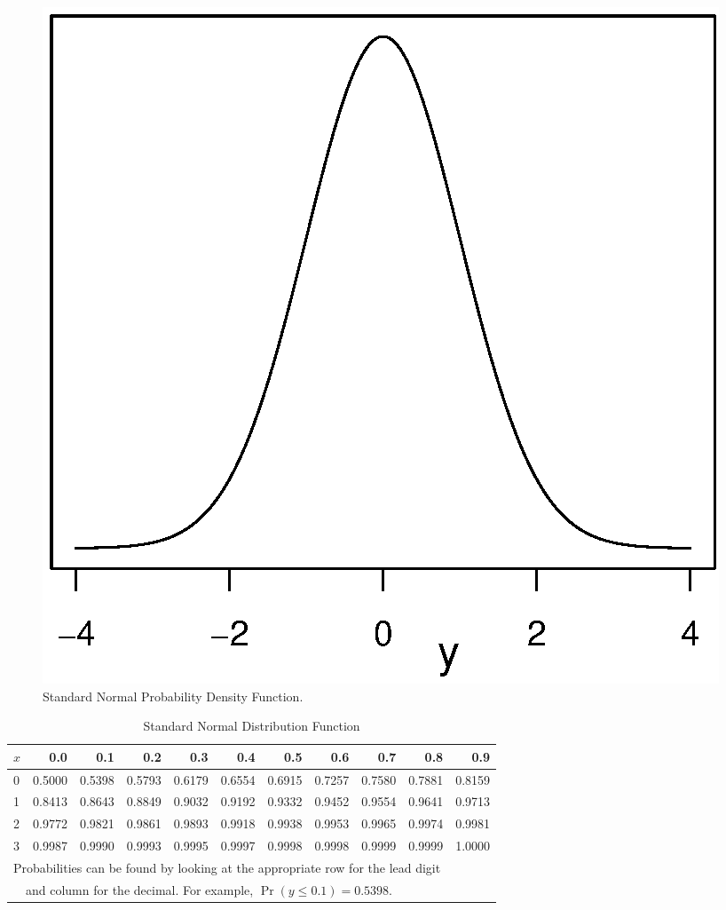 \begin{figure}[htp]
  \begin{center}
    \includegraphics[scale=.6]{Appendices/FAppendNormal.eps}
    \caption{ \small  Standard Normal Probability Density Function.}
  \end{center}
\end{figure}

\begin{table}[h]
 \caption{\label{AP:NormalProbTable} Standard Normal
Distribution Function}
\begin{tabular}{l|rrrrrrrrrr}\hline
         $x$  &          0.0 &        0.1 &        0.2 &        0.3 &        0.4 &        0.5 &        0.6 &        0.7 &        0.8 &        0.9 \\
\hline
         0 &     0.5000 &     0.5398 &     0.5793 &     0.6179 &     0.6554 &     0.6915 &     0.7257 &     0.7580 &     0.7881 &     0.8159 \\
         1 &     0.8413 &     0.8643 &     0.8849 &     0.9032 &     0.9192 &     0.9332 &     0.9452 &     0.9554 &     0.9641 &     0.9713 \\
         2 &     0.9772 &     0.9821 &     0.9861 &     0.9893 &     0.9918 &     0.9938 &     0.9953 &     0.9965 &     0.9974 &     0.9981 \\
3  & 0.9987 & 0.9990 & 0.9993 & 0.9995 & 0.9997 & 0.9998 & 0.9998 &
0.9999& 0.9999&  1.0000 \\
\hline \multicolumn{10}{l}{Probabilities can be found by looking at
the appropriate row for the lead digit } \\
\multicolumn{10}{l}{~~and column for the decimal.
For example, $\Pr ( y \leq 0.1) = 0.5398$.} \\
\hline
\end{tabular}
\end{table}



